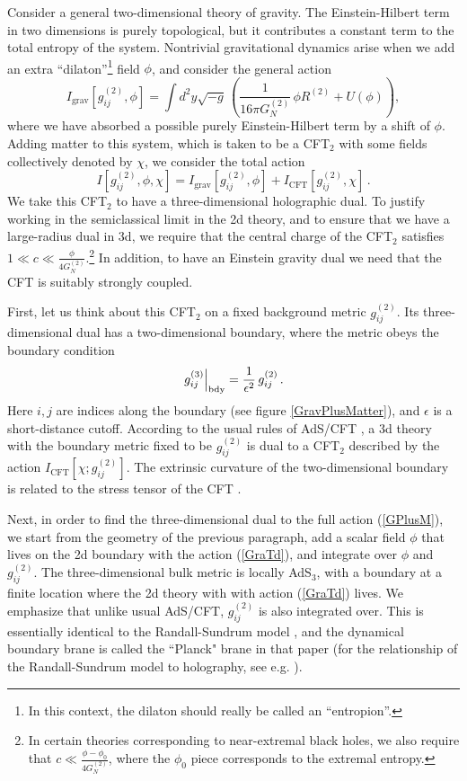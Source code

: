 \documentclass[11pt]{article}
\newcommand{\be}{\begin{equation}}
\newcommand{\ee}{\end{equation}}
\def\la{\label}
\def\nref#1{(\ref{#1})}
\begin{document}
Consider a general two-dimensional theory of gravity.  
The Einstein-Hilbert term in two dimensions is purely topological, but it contributes a constant term to the total entropy of the system.
Nontrivial gravitational dynamics arise when we add an extra ``dilaton''\footnote{In this context, the dilaton should really be called an ``entropion''.} field $\phi$, and consider the general action   
\be \la{GraTd}
I_{\text{grav}}[g^{(2)}_{ij}, \phi] = 
\int d^2y\sqrt{-g}\, \left( \frac{1}{16 \pi G_N^{(2)}} \, \phi R^{(2)} + U(\phi) \right),
\ee
where  we have absorbed a possible purely Einstein-Hilbert term by a shift of $\phi$.  
Adding matter to this system, which is taken to be a CFT$_2$ with some fields collectively denoted by $\chi$, we consider  the total action  
\be \la{GPlusM}
I[g^{(2)}_{ij}, \phi, \chi] = I_{\text{grav}}[g^{(2)}_{ij}, \phi] + I_{\text{CFT}}[g^{(2)}_{ij}, \chi] \, .
\ee
We take this  CFT$_2$ to have a three-dimensional holographic dual.
To justify working in the semiclassical limit in the 2d theory, and to ensure that we have a large-radius dual in 3d, we require that the central charge of the CFT$_2$ satisfies $1 \ll c \ll \frac{\phi}{4G_N^{(2)}}$.\footnote{In certain theories corresponding to near-extremal black holes, we also require that $c\ll \frac{\phi-\phi_0}{4G_N^{(2)}}$, where the $\phi_0$ piece corresponds to the extremal entropy.}
In addition, to have an Einstein gravity dual we need that the CFT is suitably strongly coupled.

First, let us think about this CFT$_2$ on a fixed background metric $g^{(2)}_{ij}$.
Its three-dimensional dual has a two-dimensional boundary, where the metric obeys the boundary condition %
\be \la{MetBC}
\left. g^{(3)}_{ij} \right|_{\rm bdy} = \frac{1}{\epsilon^2} 
\, g_{ij}^{(2)}\, .
\ee
Here $i,j$ are indices along the boundary (see figure \ref{GravPlusMatter}), and $\epsilon$ is a short-distance cutoff.
According to the  usual rules of AdS/CFT  \cite{Maldacena:1997re,Witten:1998qj,Gubser:1998bc}, a 3d theory with the boundary metric fixed to be $g_{ij}^{(2)}$ is dual to a CFT$_2$ described by the action $I_{ \text{CFT}}[\chi; g^{(2)}_{ij}]$.
The extrinsic curvature of the two-dimensional boundary is related to the stress tensor of the CFT  \cite{Balasubramanian:1999re}.

Next, in order to find the three-dimensional dual to the full action \nref{GPlusM}, we start from the geometry of the previous paragraph,
add a scalar field $\phi$ that lives on the 2d boundary with the action \nref{GraTd}, and integrate over $\phi$ and $g^{(2)}_{ij}$. 
The three-dimensional bulk metric is locally AdS$_3$, with a boundary at a finite location where the 2d theory with with action \nref{GraTd} lives.
We emphasize that unlike usual AdS/CFT, $g^{(2)}_{i j}$ is also integrated over.
This is essentially identical to the Randall-Sundrum model \cite{Randall:1999vf}, and the dynamical boundary brane is called the ``Planck" brane in that paper (for the relationship of the Randall-Sundrum model to holography, see e.g. \cite{Gubser:1999vj}).
\end{document}
